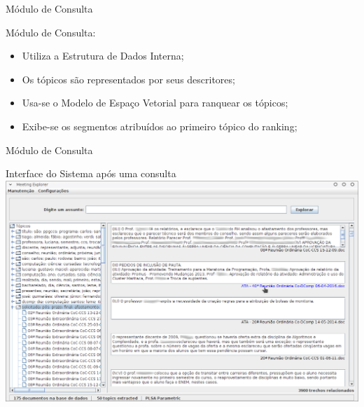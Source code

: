 \documentclass[xcolor=table]{beamer}
\begin{document}
\begin{frame}{Módulo de Consulta}

	\nblock{ } {
		Módulo de Consulta:
		\begin{itemize}
			\item Utiliza a Estrutura de Dados Interna;
			\item Os tópicos são representados por seus descritores;
			\item Usa-se o Modelo de Espaço Vetorial para ranquear os tópicos;
			\item Exibe-se os segmentos atribuídos ao primeiro tópico do ranking;
		\end{itemize}
	}








\end{frame}


\begin{frame}{Módulo de Consulta}

	\center Interface do Sistema após uma consulta\\
	\vspace{.5cm}
		\includegraphics[width=\textwidth]{images/tela-principal-2-1.png}


\end{frame}
\end{document}
